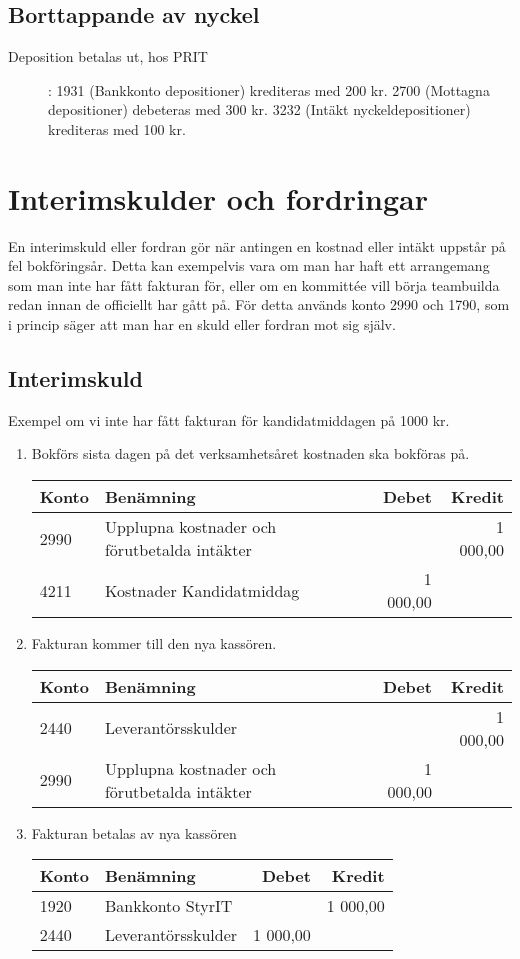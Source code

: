 \documentclass{article}
\begin{document}
\subsection{Borttappande av nyckel}
\begin{description}
    \item [Deposition betalas ut, hos PRIT]: 1931 (Bankkonto depositioner) krediteras med 200 kr. 2700 (Mottagna depositioner) debeteras med 300 kr. 3232 (Intäkt nyckeldepositioner) krediteras med 100 kr.
\end{description}


\section{Interimskulder och fordringar}
En interimskuld eller fordran gör när antingen en kostnad eller intäkt uppstår på fel bokföringsår. Detta kan exempelvis vara om man har haft ett arrangemang som man inte har fått fakturan för, eller om en kommittée vill börja teambuilda redan innan de officiellt har gått på. För detta används konto 2990 och 1790, som i princip säger att man har en skuld eller fordran mot sig själv. 

\subsection{Interimskuld}
Exempel om vi inte har fått fakturan för kandidatmiddagen på 1000 kr. 
\begin{enumerate}
\item Bokförs sista dagen på det verksamhetsåret kostnaden ska bokföras på.

\begin{tabular}{l | l | r | r}
\hline
Konto & Benämning & Debet & Kredit \\
\hline
2990 & Upplupna kostnader och förutbetalda intäkter & & 1 000,00 \\
4211 & Kostnader Kandidatmiddag & 1 000,00 &  \\
\end{tabular}

\item Fakturan kommer till den nya kassören.   

\begin{tabular}{l | l | r | r}
\hline
Konto & Benämning & Debet & Kredit \\
\hline
2440 & Leverantörsskulder &  & 1 000,00\\
2990 & Upplupna kostnader och förutbetalda intäkter & 1 000,00 &  \\
\end{tabular}

\item Fakturan betalas av nya kassören

\begin{tabular}{l | l | r | r}
\hline
Konto & Benämning & Debet & Kredit \\
\hline
1920 & Bankkonto StyrIT & & 1 000,00  \\
2440 & Leverantörsskulder & 1 000,00 & \\
\end{tabular}
\end{enumerate}
\end{document}
